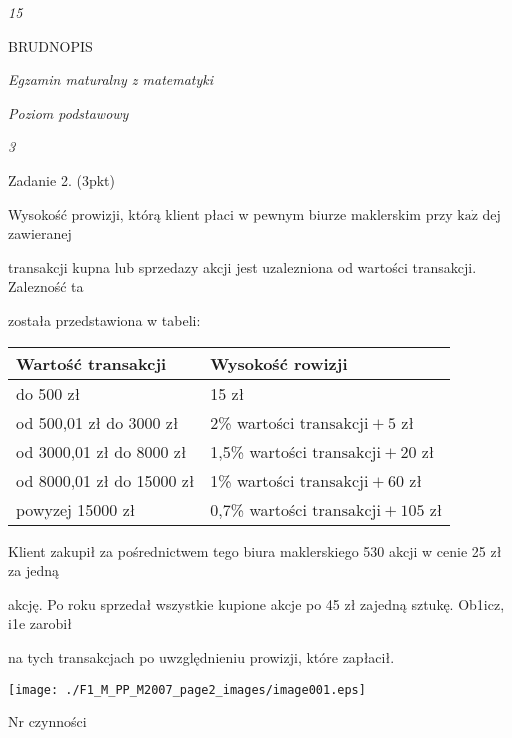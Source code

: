 \documentclass[a4paper,12pt]{article}
\begin{document}
{\it 15}

BRUDNOPIS





{\it Egzamin maturalny z matematyki}

{\it Poziom podstawowy}

{\it 3}

Zadanie 2. (3pkt)

Wysokość prowizji, którą klient płaci w pewnym biurze maklerskim przy $\mathrm{k}\mathrm{a}\dot{\mathrm{z}}$ dej zawieranej

transakcji kupna lub sprzedaz$\mathrm{y}$ akcji jest uzalezniona od wartości transakcji. Zalezność ta

została przedstawiona w tabeli:
\begin{center}
\begin{tabular}{|l|l|}
\hline
\multicolumn{1}{|l|}{Wartość transakcji}&	\multicolumn{1}{|l|}{Wysokość rowizji}	\\
\hline
\multicolumn{1}{|l|}{do 500 zł}&	\multicolumn{1}{|l|}{15 zł}	\\
\hline
\multicolumn{1}{|l|}{od 500,01 zł do 3000 zł}&	\multicolumn{1}{|l|}{2\% wartości $\mathrm{t}\mathrm{r}\mathrm{a}\mathrm{n}\mathrm{s}\mathrm{a}\mathrm{k}\mathrm{c}\mathrm{j}\mathrm{i}+5$ zł}	\\
\hline
\multicolumn{1}{|l|}{od 3000,01 zł do 8000 zł}&	\multicolumn{1}{|l|}{1,5\% wartości $\mathrm{t}\mathrm{r}\mathrm{a}\mathrm{n}\mathrm{s}\mathrm{a}\mathrm{k}\mathrm{c}\mathrm{j}\mathrm{i}+20$ zł}	\\
\hline
\multicolumn{1}{|l|}{od 8000,01 zł do 15000 zł}&	\multicolumn{1}{|l|}{1\% wartości $\mathrm{t}\mathrm{r}\mathrm{a}\mathrm{n}\mathrm{s}\mathrm{a}\mathrm{k}\mathrm{c}\mathrm{j}\mathrm{i}+60$ zł}	\\
\hline
\multicolumn{1}{|l|}{powyzej 15000 zł}&	\multicolumn{1}{|l|}{0,7\% wartości $\mathrm{t}\mathrm{r}\mathrm{a}\mathrm{n}\mathrm{s}\mathrm{a}\mathrm{k}\mathrm{c}\mathrm{j}\mathrm{i}+105$ zł}	\\
\hline
\end{tabular}

\end{center}
Klient zakupił za pośrednictwem tego biura maklerskiego 530 akcji w cenie 25 zł za jedną

akcję. Po roku sprzedał wszystkie kupione akcje po 45 zł zajedną sztukę. Ob1icz, i1e zarobił

na tych transakcjach po uwzględnieniu prowizji, które zapłacił.
\begin{center}
\texttt{[image: ./F1\_M\_PP\_M2007\_page2\_images/image001.eps]}
\end{center}
Nr czynności
\end{document}
